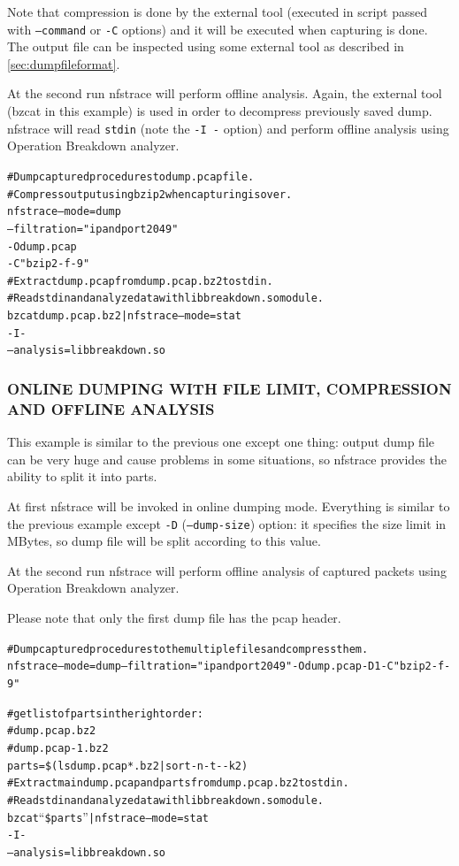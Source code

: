 \documentclass[oneside]{article}
\newcommand{\code}[1]{\texttt{#1}}
\newcommand*{\textfile}[1]{\textsf{#1}}
\newcommand*{\textprog}[1]{\textfile{#1}}
\begin{document}
Note that compression is done by the external tool (executed in script passed
with \code{--command} or \code{-C}  options) and it will be executed when
capturing is done.  The output file can be inspected using some external tool
as described in \ref{sec:dumpfileformat}.

At the second run \textprog{nfstrace} will perform offline analysis. Again, the external
tool (bzcat in this example) is used in order to decompress previously saved
dump. 
\textprog{nfstrace} will read \code{stdin} (note the \code{-I -} option) and perform offline
analysis using Operation Breakdown analyzer.

\begin{alltt}
\# Dump captured procedures to dump.pcap file.
\# Compress output using bzip2 when capturing is over. 
nfstrace --mode=dump
         --filtration="ip and port 2049"
         -O dump.pcap
         -C "bzip2 -f -9"
\# Extract dump.pcap from dump.pcap.bz2 to stdin.
\# Read stdin and analyze data with libbreakdown.so module. 
bzcat dump.pcap.bz2 | nfstrace --mode=stat
                               -I -
                               --analysis=libbreakdown.so
\end{alltt}

\subsubsection{ONLINE DUMPING WITH FILE LIMIT, COMPRESSION AND OFFLINE ANALYSIS}

This example is similar to the previous one except one thing: output dump file
can be very huge and cause problems in some situations, so \textprog{nfstrace} provides
the ability to split it into parts.

At first \textprog{nfstrace} will be invoked in online dumping mode. Everything is similar
to the previous example except \code{-D} (\code{--dump-size}) option: it specifies the size
limit in MBytes, so dump file will be split according to this value.

At the second run \textprog{nfstrace} will perform offline analysis of captured packets
using Operation Breakdown analyzer.

Please note that only the first dump file has the pcap header.

\begin{alltt}
\# Dump captured procedures to the multiple files and compress them. 
nfstrace --mode=dump --filtration="ip and port 2049" -O dump.pcap -D 1 -C "bzip2 -f -9"

\# get list of parts in the right order:
\#    dump.pcap.bz2
\#    dump.pcap-1.bz2
parts=\$(ls dump.pcap*.bz2 | sort -n -t - -k 2)
\# Extract main dump.pcap and parts from dump.pcap.bz2 to stdin.
\# Read stdin and analyze data with libbreakdown.so module. 
bzcat “\$parts” | nfstrace --mode=stat
-I -
--analysis=libbreakdown.so
\end{alltt}
\end{document}
